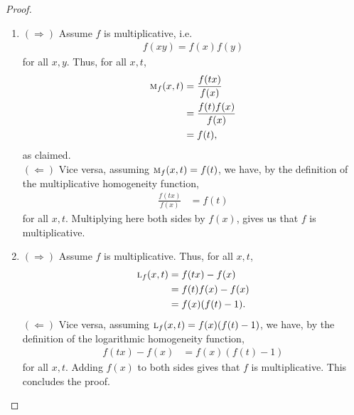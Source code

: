 \documentclass{amsart}
\theoremstyle{plain}
\numberwithin{equation}{section}
\begin{document}
\begin{proof}
    \begin{enumerate}
    \item
    \textbf{$(\Rightarrow)$} 
    Assume $f$ is multiplicative, i.e.
\begin{align*}
f(xy)= f(x)  f(y)  
\end{align*}
for all $x,y$.
 Thus, for all $x,t$,
\begin{align*}
\textsc{m}_f (x,t) &= \frac{f(tx)}{f(x)}\\
&=
\frac{f(t) f(x)}{f(x)} \\
&=
f(t),
\end{align*}
 as claimed. \\
 \textbf{$(\Leftarrow)$} Vice versa, assuming $\textsc{m}_f (x,t) = f(t)$, we have, by the definition of the multiplicative homogeneity function,
\begin{align*}
\frac{f(tx)}{f(x)}
&=
f(t)
\end{align*}
for all $x,t$. 
Multiplying here both sides by $f(x)$,
gives us that $f$ is multiplicative.
\item
 \textbf{$(\Rightarrow)$} 
    Assume $f$ is multiplicative.
Thus, for all $x,t$,
\begin{align*}
\textsc{l}_f (x,t) &= {f(tx)}-{f(x)}\\
&=
{f(t)  f(x)}-{f(x)} \\
&=
f(x)(f(t)-1).
\end{align*}
  \textbf{$(\Leftarrow)$}    Vice versa, assuming $\textsc{l}_f (x,t)=f(x)(f(t)-1)$,
     we have, by the definition of the logarithmic homogeneity function,
\begin{align*}
{f(tx)}-{f(x)}
&=
f(x)(f(t)-1)
\end{align*}
for all $x,t$.
Adding $f(x)$ to both sides gives that $f$ is multiplicative.
This concludes the proof.
\end{enumerate}
\end{proof}
\end{document}
